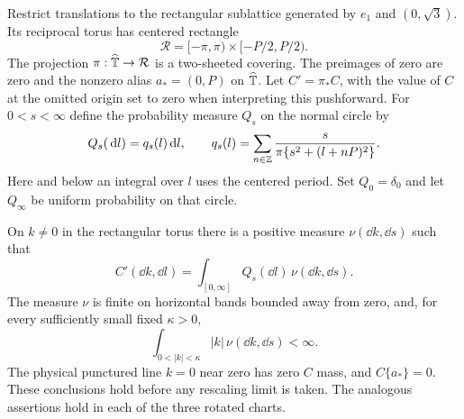 Restrict translations to the rectangular sublattice generated by $e_1$
and $(0,\sqrt3)$.  Its reciprocal torus has centered rectangle
\[
 \mathcal R=[-\pi,\pi)\times[-P/2,P/2).
\]
The projection $\pi:\widehat{\mathbb T}\to\mathcal R$ is a two-sheeted covering.
The preimages of zero are zero and the nonzero alias $a_*=(0,P)$ on
$\widehat{\mathbb T}$.  Let $C'=\pi_*C$, with the value of $C$ at the omitted
origin set to zero when interpreting this pushforward.
For $0<s<\infty$ define the probability measure $Q_s$ on the normal
circle by
\begin{equation}
 \label{plane:eq:cauchy}
 Q_s(\,\mathrm d l)=q_s(l)\,\mathrm d l,\qquad
 q_s(l)=\sum_{n\in\mathbb Z}\frac{s}{\pi\{s^2+(l+nP)^2\}}.
\end{equation}
Here and below an integral over $l$ uses the centered period.
Set $Q_0=\delta_0$ and let $Q_\infty$ be uniform probability on that circle.

\begin{lemma}
\label{plane:lem:mixture}
On $k\ne0$ in the rectangular torus there is a positive measure
$\nu(\dd k,\dd s)$ such that
\begin{equation}
 \label{plane:eq:mixture}
 C'(\dd k,\dd l)=\int_{[0,\infty]}Q_s(\dd l)\,\nu(\dd k,\dd s).
\end{equation}
The measure $\nu$ is finite on horizontal bands bounded away from zero,
and, for every sufficiently small fixed $\kappa>0$,
\begin{equation}
 \label{plane:eq:weighted-nu}
 \int_{0<|k|<\kappa}|k|\,\nu(\dd k,\dd s)<\infty.
\end{equation}
The physical punctured line $k=0$ near zero has zero $C$ mass, and
$C\{a_*\}=0$.  These conclusions hold before any rescaling limit is taken.
The analogous assertions hold in each of the three rotated charts.
\end{lemma}


